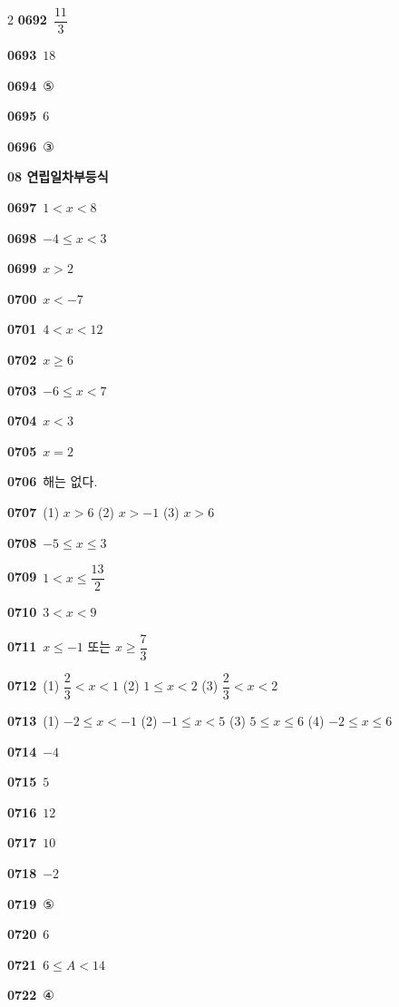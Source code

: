 \documentclass[10pt,a4paper]{article}
\begin{document}
\begin{multicols}{2}
\noindent\textbf{0692}\ $\dfrac{11}{3}$\par
\noindent\textbf{0693}\ $18$\par
\noindent\textbf{0694}\ ⑤\par
\noindent\textbf{0695}\ $6$\par
\noindent\textbf{0696}\ ③\par
\noindent\textbf{08 연립일차부등식}\par\smallskip
\noindent\textbf{0697}\ $1<x<8$\par
\noindent\textbf{0698}\ $-4\le x<3$\par
\noindent\textbf{0699}\ $x>2$\par
\noindent\textbf{0700}\ $x<-7$\par
\noindent\textbf{0701}\ $4<x<12$\par
\noindent\textbf{0702}\ $x\ge 6$\par
\noindent\textbf{0703}\ $-6\le x<7$\par
\noindent\textbf{0704}\ $x<3$\par
\noindent\textbf{0705}\ $x=2$\par
\noindent\textbf{0706}\ 해는 없다.\par
\noindent\textbf{0707}\ (1) $x>6$ (2) $x>-1$ (3) $x>6$\par
\noindent\textbf{0708}\ $-5\le x\le 3$\par
\noindent\textbf{0709}\ $1<x\le \dfrac{13}{2}$\par
\noindent\textbf{0710}\ $3<x<9$\par
\noindent\textbf{0711}\ $x\le -1$ 또는 $x\ge \dfrac{7}{3}$\par
\noindent\textbf{0712}\ (1) $\dfrac{2}{3}<x<1$ (2) $1\le x<2$ (3) $\dfrac{2}{3}<x<2$\par
\noindent\textbf{0713}\ (1) $-2\le x<-1$ (2) $-1\le x<5$ (3) $5\le x\le 6$ (4) $-2\le x\le 6$\par
\noindent\textbf{0714}\ $-4$\par
\noindent\textbf{0715}\ $5$\par
\noindent\textbf{0716}\ $12$\par
\noindent\textbf{0717}\ $10$\par
\noindent\textbf{0718}\ $-2$\par
\noindent\textbf{0719}\ ⑤\par
\noindent\textbf{0720}\ $6$\par
\noindent\textbf{0721}\ $6\le A<14$\par
\noindent\textbf{0722}\ ④\par

\end{multicols}
\end{document}
